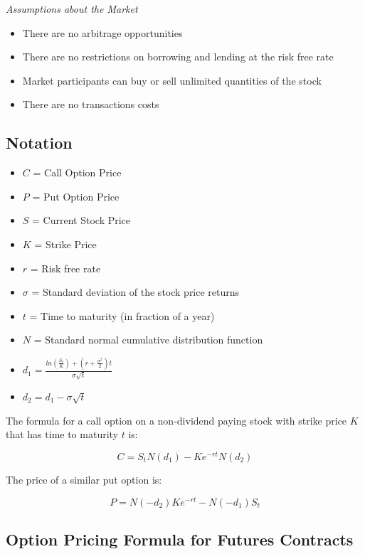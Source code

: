 \documentclass[
  letterpaper,
  DIV=11,
  numbers=noendperiod]{scrreprt}
\begin{document}
\emph{Assumptions about the Market}

\begin{itemize}
\item
  There are no arbitrage opportunities
\item
  There are no restrictions on borrowing and lending at the risk free
  rate
\item
  Market participants can buy or sell unlimited quantities of the stock
\item
  There are no transactions costs
\end{itemize}

\hypertarget{notation}{%
\subsection{Notation}\label{notation}}

\begin{itemize}
\item
  \(C\) = Call Option Price
\item
  \(P\) = Put Option Price
\item
  \(S\) = Current Stock Price
\item
  \(K\) = Strike Price
\item
  \(r\) = Risk free rate
\item
  \(\sigma\) = Standard deviation of the stock price returns
\item
  \(t\) = Time to maturity (in fraction of a year)
\item
  \(N\) = Standard normal cumulative distribution function
\item
  \(d_{1} = \frac{ln(\frac{S_{t}}{K}) + (r + \frac{\sigma^{2}}{2})t}{\sigma \sqrt{t}}\)
\item
  \(d_{2} = d_{1} - \sigma \sqrt{t}\)
\end{itemize}

The formula for a call option on a non-dividend paying stock with strike
price \(K\) that has time to maturity \(t\) is:

\[C = S_{t}N(d_{1}) - K e^{-rt} N(d_{2})\]

The price of a similar put option is:

\[
P = N(-d_{2}) K e^{-rt} - N(-d_{1}) S_{t}
\]

\hypertarget{option-pricing-formula-for-futures-contracts}{%
\subsection{Option Pricing Formula for Futures
Contracts}\label{option-pricing-formula-for-futures-contracts}}
\end{document}
